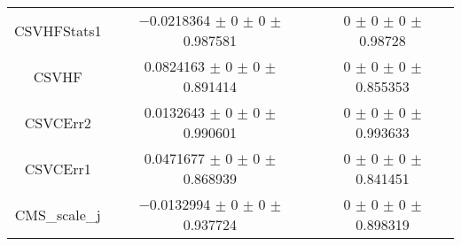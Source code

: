 \begin{table}
\begin{tabular}{ccc}
CSVHFStats1 & \num{-0.0218364} $\pm$ \num{0} $\pm$ \num{0} $\pm$ \num{0.987581} & \num{0} $\pm$ \num{0} $\pm$ \num{0} $\pm$ \num{0.98728}\\
CSVHF & \num{0.0824163} $\pm$ \num{0} $\pm$ \num{0} $\pm$ \num{0.891414} & \num{0} $\pm$ \num{0} $\pm$ \num{0} $\pm$ \num{0.855353}\\
CSVCErr2 & \num{0.0132643} $\pm$ \num{0} $\pm$ \num{0} $\pm$ \num{0.990601} & \num{0} $\pm$ \num{0} $\pm$ \num{0} $\pm$ \num{0.993633}\\
CSVCErr1 & \num{0.0471677} $\pm$ \num{0} $\pm$ \num{0} $\pm$ \num{0.868939} & \num{0} $\pm$ \num{0} $\pm$ \num{0} $\pm$ \num{0.841451}\\
CMS\_scale\_j & \num{-0.0132994} $\pm$ \num{0} $\pm$ \num{0} $\pm$ \num{0.937724} & \num{0} $\pm$ \num{0} $\pm$ \num{0} $\pm$ \num{0.898319}\\
\bottomrule
\end{tabular}
\end{table}